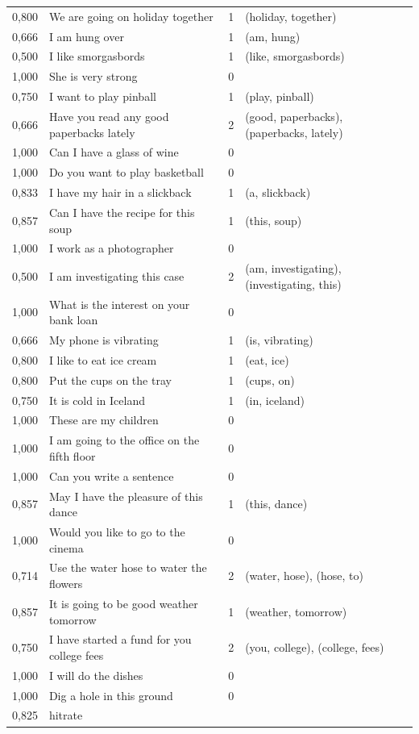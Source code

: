 \documentclass[a4paper,12pt]{article}
\begin{document}
\begin{landscape}
\begin{longtable}{l l r l}
0,800 & We are going on holiday together & 1 & (holiday, together) \\
0,666 & I am hung over & 1 & (am, hung) \\
0,500 & I like smorgasbords & 1 & (like, smorgasbords) \\
1,000 & She is very strong & 0 &  \\
0,750 & I want to play pinball & 1 & (play, pinball) \\
0,666 & Have you read any good paperbacks lately & 2 & (good, paperbacks), (paperbacks, lately) \\
1,000 & Can I have a glass of wine & 0 &  \\
1,000 & Do you want to play basketball & 0 &  \\
0,833 & I have my hair in a slickback & 1 & (a, slickback) \\
0,857 & Can I have the recipe for this soup & 1 & (this, soup) \\
1,000 & I work as a photographer & 0 &  \\
0,500 & I am investigating this case & 2 & (am, investigating), (investigating, this) \\
1,000 & What is the interest on your bank loan & 0 &  \\
0,666 & My phone is vibrating & 1 & (is, vibrating) \\
0,800 & I like to eat ice cream & 1 & (eat, ice) \\
0,800 & Put the cups on the tray & 1 & (cups, on) \\
0,750 & It is cold in Iceland & 1 & (in, iceland) \\
1,000 & These are my children & 0 &  \\
1,000 & I am going to the office on the fifth floor & 0 &  \\
1,000 & Can you write a sentence & 0 &  \\
0,857 & May I have the pleasure of this dance & 1 & (this, dance) \\
1,000 & Would you like to go to the cinema & 0 &  \\
0,714 & Use the water hose to water the flowers & 2 & (water, hose), (hose, to) \\
0,857 & It is going to be good weather tomorrow & 1 & (weather, tomorrow) \\
0,750 & I have started a fund for you college fees & 2 & (you, college), (college, fees) \\
1,000 & I will do the dishes & 0 &  \\
1,000 & Dig a hole in this ground & 0 &  \\
\hline
0,825 & hitrate
\label{tab:resultcorrect}
\end{longtable}
\end{landscape}
\end{document}
